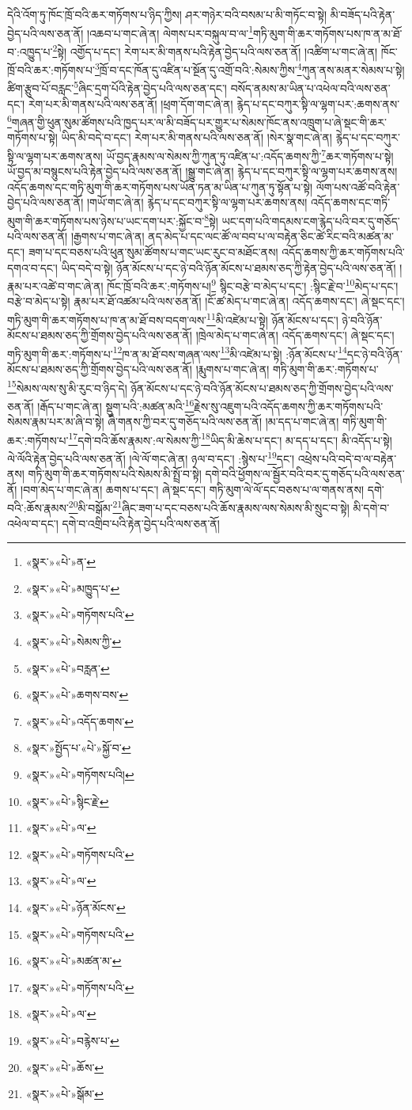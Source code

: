 དེའི་འོག་ཏུ་ཁོང་ཁྲོ་བའི་ཆར་གཏོགས་པ་ཉིད་ཀྱིས། ཤར་གཉེར་བའི་བསམ་པ་མི་གཏོང་བ་སྟེ། མི་བཟོད་པའི་རྟེན་བྱེད་པའི་ལས་ཅན་ནོ། །འཆབ་པ་གང་ཞེ་ན། ལེགས་པར་བསྐུལ་བ་ལ་\footnote{«སྣར་»«པེ་»ན་}གཏི་མུག་གི་ཆར་གཏོགས་པས་ཁ་ན་མ་ཐོ་བ་:འཁྱུད་པ་\footnote{«སྣར་»«པེ་»མཁྱུད་པ་}སྟེ། འགྱོད་པ་དང་། རེག་པར་མི་གནས་པའི་རྟེན་བྱེད་པའི་ལས་ཅན་ནོ། །འཚིག་པ་གང་ཞེ་ན། ཁོང་ཁྲོ་བའི་ཆར་:གཏོགས་པ་\footnote{«སྣར་»«པེ་»གཏོགས་པའི་}ཁྲོ་བ་དང་ཁོན་དུ་འཛིན་པ་སྔོན་དུ་འགྲོ་བའི་:སེམས་ཀྱིས་\footnote{«སྣར་»«པེ་»སེམས་ཀྱི་}ཀུན་ནས་མནར་སེམས་པ་སྟེ། ཚིག་རྩུབ་པོ་བརླང་\footnote{«སྣར་»«པེ་»བརླན་}ཞིང་དྲག་པོའི་རྟེན་བྱེད་པའི་ལས་ཅན་དང་། བསོད་ནམས་མ་ཡིན་པ་འཕེལ་བའི་ལས་ཅན་དང་། རེག་པར་མི་གནས་པའི་ལས་ཅན་ནོ། །ཕྲག་དོག་གང་ཞེ་ན། རྙེད་པ་དང་བཀུར་སྟི་ལ་ལྷག་པར་:ཆགས་ནས་\footnote{«སྣར་»«པེ་»ཆགས་བས་}གཞན་གྱི་ཕུན་སུམ་ཚོགས་པའི་ཁྱད་པར་ལ་མི་བཟོད་པར་གྱུར་པ་སེམས་ཁོང་ནས་འཁྲུག་པ་ཞེ་སྡང་གི་ཆར་གཏོགས་པ་སྟེ། ཡིད་མི་བདེ་བ་དང་། རེག་པར་མི་གནས་པའི་ལས་ཅན་ནོ། །སེར་སྣ་གང་ཞེ་ན། རྙེད་པ་དང་བཀུར་སྟི་ལ་ལྷག་པར་ཆགས་ནས། ཡོ་བྱད་རྣམས་ལ་སེམས་ཀྱི་ཀུན་ཏུ་འཛིན་པ་:འདོད་ཆགས་ཀྱི་\footnote{«སྣར་»«པེ་»འདོད་ཆགས་}ཆར་གཏོགས་པ་སྟེ། ཡོ་བྱད་མ་བསྙུངས་པའི་རྟེན་བྱེད་པའི་ལས་ཅན་ནོ། །སྒྱུ་གང་ཞེ་ན། རྙེད་པ་དང་བཀུར་སྟི་ལ་ལྷག་པར་ཆགས་ནས། འདོད་ཆགས་དང་གཏི་མུག་གི་ཆར་གཏོགས་པས་ཡོན་ཏན་མ་ཡིན་པ་ཀུན་ཏུ་སྟོན་པ་སྟེ། ལོག་པས་འཚོ་བའི་རྟེན་བྱེད་པའི་ལས་ཅན་ནོ། །གཡོ་གང་ཞེ་ན། རྙེད་པ་དང་བཀུར་སྟི་ལ་ལྷག་པར་ཆགས་ནས། འདོད་ཆགས་དང་གཏི་མུག་གི་ཆར་གཏོགས་པས་ཉེས་པ་ཡང་དག་པར་:སྐྱོང་བ་\footnote{«སྣར་»སྤྱོད་པ་«པེ་»སྐྱོ་བ་}སྟེ། ཡང་དག་པའི་གདམས་ངག་རྙེད་པའི་བར་དུ་གཅོད་པའི་ལས་ཅན་ནོ། །རྒྱགས་པ་གང་ཞེ་ན། ནད་མེད་པ་དང་ལང་ཚོ་ལ་བབ་པ་ལ་བརྟེན་ཅིང་ཚེ་རིང་བའི་མཚན་མ་དང་། ཟག་པ་དང་བཅས་པའི་ཕུན་སུམ་ཚོགས་པ་གང་ཡང་རུང་བ་མཐོང་ནས། འདོད་ཆགས་ཀྱི་ཆར་གཏོགས་པའི་དགའ་བ་དང་། ཡིད་བདེ་བ་སྟེ། ཉོན་མོངས་པ་དང་ཉེ་བའི་ཉོན་མོངས་པ་ཐམས་ཅད་ཀྱི་རྟེན་བྱེད་པའི་ལས་ཅན་ནོ། །རྣམ་པར་འཚེ་བ་གང་ཞེ་ན། ཁོང་ཁྲོ་བའི་ཆར་:གཏོགས་པ།\footnote{«སྣར་»«པེ་»གཏོགས་པའི།} སྙིང་བརྩེ་བ་མེད་པ་དང་། :སྙིང་རྗེ་བ་\footnote{«སྣར་»«པེ་»སྙིང་རྗེ་}མེད་པ་དང་། བརྩེ་བ་མེད་པ་སྟེ། རྣམ་པར་ཐོ་འཚམ་པའི་ལས་ཅན་ནོ། །ངོ་ཚ་མེད་པ་གང་ཞེ་ན། འདོད་ཆགས་དང་། ཞེ་སྡང་དང་། གཏི་མུག་གི་ཆར་གཏོགས་པ་ཁ་ན་མ་ཐོ་བས་བདག་ལས་\footnote{«སྣར་»«པེ་»ལ་}མི་འཛེམ་པ་སྟེ། ཉོན་མོངས་པ་དང་། ཉེ་བའི་ཉོན་མོངས་པ་ཐམས་ཅད་ཀྱི་གྲོགས་བྱེད་པའི་ལས་ཅན་ནོ། །ཁྲེལ་མེད་པ་གང་ཞེ་ན། འདོད་ཆགས་དང་། ཞེ་སྡང་དང་། གཏི་མུག་གི་ཆར་:གཏོགས་པ་\footnote{«སྣར་»«པེ་»གཏོགས་པའི་}ཁ་ན་མ་ཐོ་བས་གཞན་ལས་\footnote{«སྣར་»«པེ་»ལ་}མི་འཛེམ་པ་སྟེ། :ཉོན་མོངས་པ་\footnote{«སྣར་»«པེ་»ཉོན་མོངས་}དང་ཉེ་བའི་ཉོན་མོངས་པ་ཐམས་ཅད་ཀྱི་གྲོགས་བྱེད་པའི་ལས་ཅན་ནོ། །རྨུགས་པ་གང་ཞེ་ན། གཏི་མུག་གི་ཆར་:གཏོགས་པ་\footnote{«སྣར་»«པེ་»གཏོགས་པའི་}སེམས་ལས་སུ་མི་རུང་བ་ཉིད་དེ། ཉོན་མོངས་པ་དང་ཉེ་བའི་ཉོན་མོངས་པ་ཐམས་ཅད་ཀྱི་གྲོགས་བྱེད་པའི་ལས་ཅན་ནོ། །རྒོད་པ་གང་ཞེ་ན། སྡུག་པའི་:མཚན་མའི་\footnote{«སྣར་»«པེ་»མཚན་མ་}རྗེས་སུ་འཇུག་པའི་འདོད་ཆགས་ཀྱི་ཆར་གཏོགས་པའི་སེམས་རྣམ་པར་མ་ཞི་བ་སྟེ། ཞི་གནས་ཀྱི་བར་དུ་གཅོད་པའི་ལས་ཅན་ནོ། །མ་དད་པ་གང་ཞེ་ན། གཏི་མུག་གི་ཆར་:གཏོགས་པ་\footnote{«སྣར་»«པེ་»གཏོགས་པའི་}དགེ་བའི་ཆོས་རྣམས་:ལ་སེམས་ཀྱི་\footnote{«སྣར་»«པེ་»ལ་}ཡིད་མི་ཆེས་པ་དང་། མ་དད་པ་དང་། མི་འདོད་པ་སྟེ། ལེ་ལོའི་རྟེན་བྱེད་པའི་ལས་ཅན་ནོ། །ལེ་ལོ་གང་ཞེ་ན། ཉལ་བ་དང་། :སྙེས་པ་\footnote{«སྣར་»«པེ་»བརྙེས་པ་}དང་། འཕྲེས་པའི་བདེ་བ་ལ་བརྟེན་ནས། གཏི་མུག་གི་ཆར་གཏོགས་པའི་སེམས་མི་སྤྲོ་བ་སྟེ། དགེ་བའི་ཕྱོགས་ལ་སྦྱོར་བའི་བར་དུ་གཅོད་པའི་ལས་ཅན་ནོ། །བག་མེད་པ་གང་ཞེ་ན། ཆགས་པ་དང་། ཞེ་སྡང་དང་། གཏི་མུག་ལེ་ལོ་དང་བཅས་པ་ལ་གནས་ནས། དགེ་བའི་:ཆོས་རྣམས་\footnote{«སྣར་»«པེ་»ཆོས་}མི་བསྒོམ་\footnote{«སྣར་»«པེ་»སྒོམ་}ཞིང་ཟག་པ་དང་བཅས་པའི་ཆོས་རྣམས་ལས་སེམས་མི་སྲུང་བ་སྟེ། མི་དགེ་བ་འཕེལ་བ་དང་། དགེ་བ་འགྲིབ་པའི་རྟེན་བྱེད་པའི་ལས་ཅན་ནོ། 